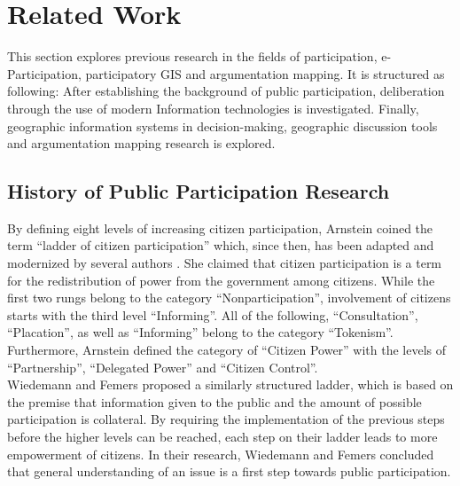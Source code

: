 \section{Related Work}
\label{chap:related_work}
This section explores previous research in the fields of participation, e-Participation, participatory GIS and argumentation mapping. It is structured as following: After establishing the background of public participation, deliberation through the use of modern Information technologies is investigated. Finally, geographic information systems in decision-making, geographic discussion tools and argumentation mapping research is explored.


\subsection{History of Public Participation Research}
By defining eight levels of increasing citizen participation, Arnstein \cite{Arnstein1969_citizen_participation} coined the term ``ladder of citizen participation'' which, since then, has been adapted and modernized by several authors \cite{Connor1988_new_ladder,carver2003future,Collins2009_social_learning,you2009_participatory_map_based,Cai2009_spatial_annotation_deliberation,Macintosh2004_eParticipation_characterization,Schlossberg2005_PPGIS}.  She claimed that citizen participation is a term for the redistribution of power from the government among citizens. While the first two rungs belong to the category ``Nonparticipation'', involvement of citizens starts with the third level ``Informing''. All of the following, ``Consultation'', ``Placation'', as well as ``Informing'' belong to the category ``Tokenism''. Furthermore, Arnstein defined the category of ``Citizen Power'' with the levels of ``Partnership'', ``Delegated Power'' and ``Citizen Control''.\\
Wiedemann and Femers \cite{Wiedemann1993355} proposed a similarly structured ladder, which is based on the premise that information given to the public and the amount of possible participation is collateral. By requiring the implementation of the previous steps before the higher levels can be reached, each step on their ladder leads to more empowerment of citizens. In their research, Wiedemann and Femers concluded that general understanding of an issue is a first step towards public participation.\\
